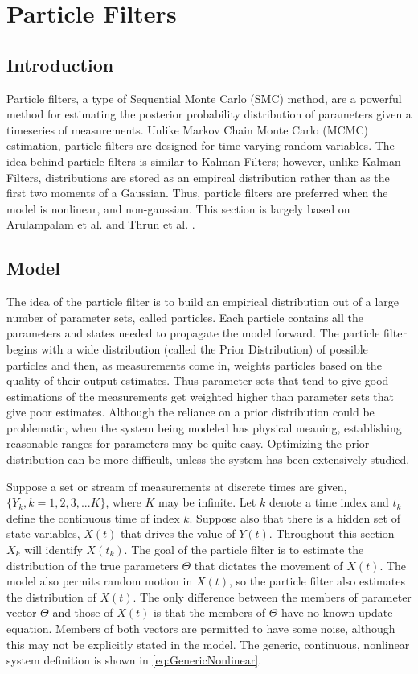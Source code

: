\chapter{Particle Filters}
\label{sec:Particle Filter}
\section{Introduction}
Particle filters, a type of Sequential Monte Carlo (SMC) method,
are a powerful method for estimating the posterior probability distribution
 of parameters given a timeseries of measurements. Unlike Markov 
Chain Monte Carlo (MCMC) estimation, particle filters are designed for 
time-varying random variables. The idea behind particle filters is
similar to Kalman Filters; however, unlike Kalman Filters,
distributions are stored as an empircal distribution rather than 
as the first two moments of a Gaussian. Thus, particle filters are 
preferred when the model is nonlinear, and non-gaussian. This section
is largely based on Arulampalam et al. and Thrun et al. \cite{Arulampalam2002a, 
thrun2008probabilistic}.

\section{Model}
\label{sec:Particle Filter Model}
The idea of the particle filter is to build an empirical distribution
out of a large number of parameter sets, called particles. Each
particle contains all the parameters and states needed to propagate
the model forward.  The particle filter begins with a wide distribution 
(called the Prior Distribution)
of possible particles and then, as measurements come in, weights 
particles based on the quality of their output estimates. Thus parameter sets 
that tend to give good estimations of the measurements get weighted higher
than parameter sets that give poor estimates. Although the reliance on
a prior distribution could be problematic, when the system being modeled
has physical meaning, establishing reasonable ranges for parameters may be 
quite easy. Optimizing the prior distribution can be more difficult,
unless the system has been extensively studied.

Suppose a set or stream of measurements at discrete times are given, 
$\{Y_k, k = 1, 2, 3, ... K\}$, where $K$ may be infinite. 
Let $k$ denote a time index and $t_k$ define the continuous
time of index $k$.
Suppose also that there is a hidden set of state variables,
$X(t)$ that drives the value of $Y(t)$. Throughout this section
$X_k$ will identify $X(t_k)$. The goal of the particle filter is to estimate the 
distribution of the
true parameters $\Theta$ that dictates the movement of $X(t)$.
The model also permits random motion in $X(t)$, so the 
particle filter also estimates the distribution of $X(t)$.
The only difference between the members of parameter vector
$\Theta$ and those of $X(t)$ is that the members of
$\Theta$ have no known update equation. Members of both vectors
are permitted to have some noise, although this
may not be explicitly stated in the model. The generic, continuous, nonlinear
system definition is shown in \autoref{eq:GenericNonlinear}.

